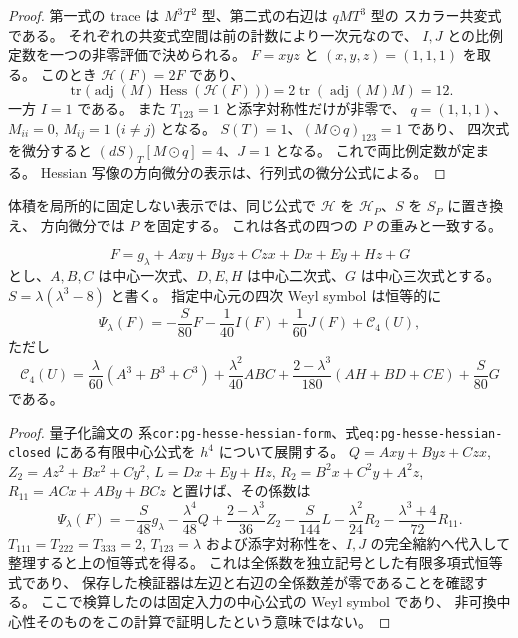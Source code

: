 \begin{proof}
第一式の trace は $M^3T^2$ 型、第二式の右辺は $qMT^3$ 型の
スカラー共変式である。
それぞれの共変式空間は前の計数により一次元なので、
$I,J$ との比例定数を一つの非零評価で決められる。
$F=xyz$ と $(x,y,z)=(1,1,1)$ を取る。
このとき $\mathscr H(F)=2F$ であり、
\[
 \operatorname{tr}\bigl(\operatorname{adj}(M)
           \operatorname{Hess}(\mathscr H(F))\bigr)
       =2\operatorname{tr}(\operatorname{adj}(M)M)=12.
\]
一方 $I=1$ である。
また $T_{123}=1$ と添字対称性だけが非零で、
$q=(1,1,1)$、$M_{ii}=0$, $M_{ij}=1$ ($i\ne j$) となる。
$S(T)=1$、$(M\odot q)_{123}=1$ であり、
四次式を微分すると $(dS)_T[M\odot q]=4$、$J=1$ となる。
これで両比例定数が定まる。
Hessian 写像の方向微分の表示は、行列式の微分公式による。
\end{proof}

体積を局所的に固定しない表示では、同じ公式で
$\mathscr H$ を $\mathscr H_P$、$S$ を $S_P$ に置き換え、
方向微分では $P$ を固定する。
これは各式の四つの $P$ の重みと一致する。

\begin{lemma}
\label{lem:nfm-fourth-center-symbol}
\[
 F=g_\lambda+Axy+Byz+Czx+Dx+Ey+Hz+G
\]
とし、$A,B,C$ は中心一次式、$D,E,H$ は中心二次式、$G$ は中心三次式とする。
$S=\lambda(\lambda^3-8)$ と書く。
指定中心元の四次 Weyl symbol は恒等的に
\[
 \Psi_\lambda(F)=-\frac{S}{80}F-\frac1{40}I(F)
                         +\frac1{60}J(F)+\mathcal C_4(U),
\]
ただし
\[
 \mathcal C_4(U)=
  \frac{\lambda}{60}(A^3+B^3+C^3)
  +\frac{\lambda^2}{40}ABC
  +\frac{2-\lambda^3}{180}(AH+BD+CE)
  +\frac{S}{80}G
\]
である。
\end{lemma}

\begin{proof}
量子化論文\cite{CubicQuantization}の
系\texttt{cor:pg-hesse-hessian-form}、式\texttt{eq:pg-hesse-hessian-closed}
にある有限中心公式を $h^4$ について展開する。
$Q=Axy+Byz+Czx$, $Z_2=Az^2+Bx^2+Cy^2$,
$L=Dx+Ey+Hz$, $R_2=B^2x+C^2y+A^2z$,
$R_{11}=ACx+ABy+BCz$ と置けば、その係数は
\[
 \Psi_\lambda(F)=
 -\frac S{48}g_\lambda-\frac{\lambda^4}{48}Q
 +\frac{2-\lambda^3}{36}Z_2-\frac S{144}L
 -\frac{\lambda^2}{24}R_2-\frac{\lambda^3+4}{72}R_{11}.
\]
$T_{111}=T_{222}=T_{333}=2$, $T_{123}=\lambda$
および添字対称性を、$I,J$ の完全縮約へ代入して整理すると上の恒等式を得る。
これは全係数を独立記号とした有限多項式恒等式であり、
保存した検証器は左辺と右辺の全係数差が零であることを確認する。
ここで検算したのは固定入力の中心公式の Weyl symbol であり、
非可換中心性そのものをこの計算で証明したという意味ではない。
\end{proof}



